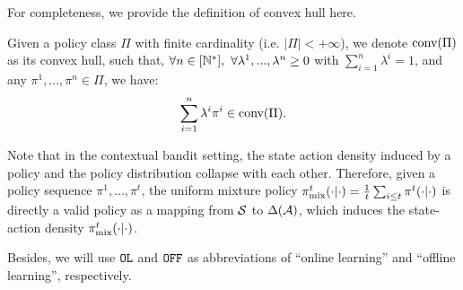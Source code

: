 For completeness, we provide the definition of convex hull here.
\begin{definition}\label{def:convex_hull}
    Given a policy class $\Pi$ with finite cardinality (i.e. $|\Pi| < +\infty$), we denote $\text{conv}(\Pi)$ as its convex hull, such that, $\forall n \in [{\mathbb{N}}^*],~\forall \lambda^1,...,\lambda^n \geq 0$ with $\sum_{i=1}^n \lambda^i = 1$, and any $\pi^1,...,\pi^n \in \Pi$, we have:
    \begin{align*}
        \sum_{i=1}^n \lambda^i \pi^i \in \text{conv}(\Pi).
    \end{align*}
\end{definition}


\begin{remark}
    Note that in the contextual bandit setting, the state action density induced by a policy and the policy distribution collapse with each other.
    Therefore, given a policy sequence $\pi^1,...,\pi^t$, the uniform mixture policy $\pi_{\text{mix}}^t(\cdot|\cdot) = \frac{1}{t}\sum_{i\leq t} \pi^t(\cdot|\cdot)$ is directly a valid policy as a mapping from $\mathcal{S}$ to $\Delta(\mathcal{A})$, which induces the state-action density $\pi_{\text{mix}}^t(\cdot|\cdot)$.

    Besides, we will use $\texttt{OL}$ and $\texttt{OFF}$ as abbreviations of ``online learning'' and ``offline learning'', respectively.
\end{remark}